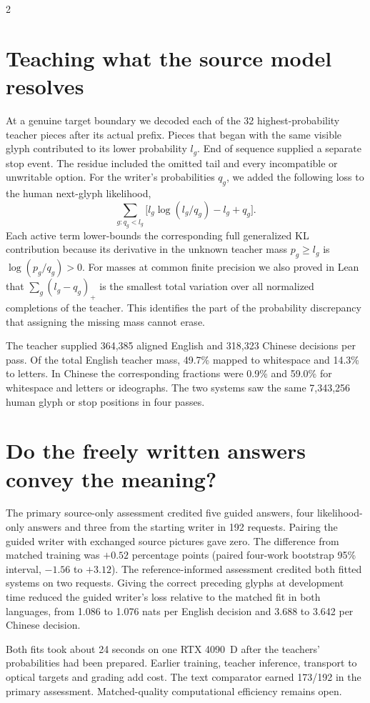 \begin{multicols}{2}
\section*{Teaching what the source model resolves}
At a genuine target boundary we decoded each of the 32 highest-probability teacher pieces after its actual prefix. Pieces that began with the same visible glyph contributed to its lower probability $l_g$. End of sequence supplied a separate stop event. The residue included the omitted tail and every incompatible or unwritable option. For the writer's probabilities $q_g$, we added the following loss to the human next-glyph likelihood,
\[
 \sum_{g:q_g<l_g}\!\big[l_g\log(l_g/q_g)-l_g+q_g\big].
\]
Each active term lower-bounds the corresponding full generalized KL contribution because its derivative in the unknown teacher mass $p_g\ge l_g$ is $\log(p_g/q_g)>0$. For masses at common finite precision we also proved in Lean that $\sum_g(l_g-q_g)_+$ is the smallest total variation over all normalized completions of the teacher. This identifies the part of the probability discrepancy that assigning the missing mass cannot erase.
\par The teacher supplied 364,385 aligned English and 318,323 Chinese decisions per pass. Of the total English teacher mass, 49.7\% mapped to whitespace and 14.3\% to letters. In Chinese the corresponding fractions were 0.9\% and 59.0\% for whitespace and letters or ideographs. The two systems saw the same 7,343,256 human glyph or stop positions in four passes.
\section*{Do the freely written answers convey the meaning?}
The primary source-only assessment credited five guided answers, four likelihood-only answers and three from the starting writer in 192 requests. Pairing the guided writer with exchanged source pictures gave zero. The difference from matched training was $+0.52$ percentage points (paired four-work bootstrap 95\% interval, $-1.56$ to $+3.12$). The reference-informed assessment credited both fitted systems on two requests. Giving the correct preceding glyphs at development time reduced the guided writer's loss relative to the matched fit in both languages, from 1.086 to 1.076 nats per English decision and 3.688 to 3.642 per Chinese decision.
\par Both fits took about 24 seconds on one RTX 4090~D after the teachers' probabilities had been prepared. Earlier training, teacher inference, transport to optical targets and grading add cost. The text comparator earned 173/192 in the primary assessment. Matched-quality computational efficiency remains open.
\end{multicols}

